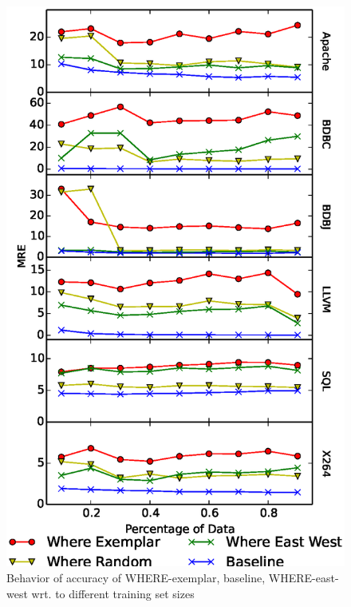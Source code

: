 \documentclass{sig-alternative}
\begin{document}
\begin{figure}[!t]
\includegraphics[width=0.9\linewidth]{Figures/SamplingAccuracy.eps}
\caption{Behavior of accuracy of WHERE-exemplar, baseline, WHERE-east-west wrt. to different training set sizes }\label{fig:sampling_accuracy}
\end{figure}
\end{document}

